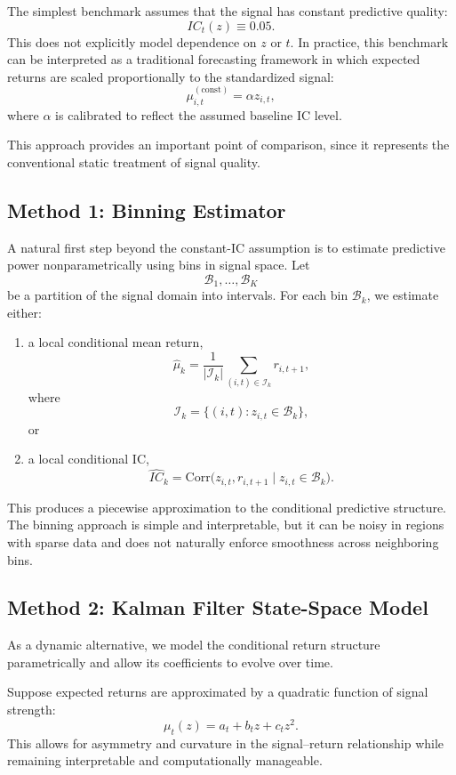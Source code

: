 \documentclass[11pt]{article}
\begin{document}
The simplest benchmark assumes that the signal has constant predictive quality:
\[
IC_t(z) \equiv 0.05.
\]
This does not explicitly model dependence on $z$ or $t$. In practice, this benchmark can be interpreted as a traditional forecasting framework in which expected returns are scaled proportionally to the standardized signal:
\[
\mu_{i,t}^{(\mathrm{const})} = \alpha z_{i,t},
\]
where $\alpha$ is calibrated to reflect the assumed baseline IC level.

This approach provides an important point of comparison, since it represents the conventional static treatment of signal quality.

\subsection{Method 1: Binning Estimator}

A natural first step beyond the constant-IC assumption is to estimate predictive power nonparametrically using bins in signal space. Let
\[
\mathcal{B}_1,\dots,\mathcal{B}_K
\]
be a partition of the signal domain into intervals. For each bin $\mathcal{B}_k$, we estimate either:

\begin{enumerate}[label=(\alph*)]
    \item a local conditional mean return,
    \[
    \widehat{\mu}_k = \frac{1}{|\mathcal{I}_k|}\sum_{(i,t)\in \mathcal{I}_k} r_{i,t+1},
    \]
    where
    \[
    \mathcal{I}_k = \{(i,t): z_{i,t}\in \mathcal{B}_k\},
    \]
    or
    \item a local conditional IC,
    \[
    \widehat{IC}_k = \mathrm{Corr}\big(z_{i,t}, r_{i,t+1}\mid z_{i,t}\in\mathcal{B}_k\big).
    \]
\end{enumerate}

This produces a piecewise approximation to the conditional predictive structure. The binning approach is simple and interpretable, but it can be noisy in regions with sparse data and does not naturally enforce smoothness across neighboring bins.

\subsection{Method 2: Kalman Filter State-Space Model}

As a dynamic alternative, we model the conditional return structure parametrically and allow its coefficients to evolve over time.

Suppose expected returns are approximated by a quadratic function of signal strength:
\[
\mu_t(z) = a_t + b_t z + c_t z^2.
\]
This allows for asymmetry and curvature in the signal--return relationship while remaining interpretable and computationally manageable.
\end{document}
